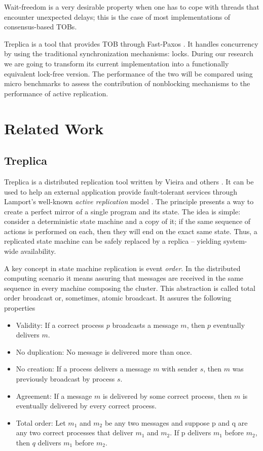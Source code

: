 \documentclass[12pt]{article}
\begin{document}
Wait-freedom is a very  desirable property when one has to cope with threads
that encounter unexpected delays; this  is the case
of  most  implementations of  consensus-based  TOBs.

Treplica \cite{vieira2008} is a tool that provides TOB through Fast-Paxos
\cite{Lamport2006}. It handles concurrency by using the traditional
synchronization mechanisms: locks. During our research we are going to transform
its current implementation  into a functionally equivalent lock-free version.
The  performance of the two will be compared using micro benchmarks to assess
the contribution  of nonblocking mechanisms to the  performance of active
replication.


\section{Related Work}
\label{sec:related}
\subsection{Treplica}
Treplica is a distributed replication tool written by Vieira and others
\cite{vieira2008}. It can be used to help an external application provide
fault-tolerant services through Lamport's well-known \textit{active replication}
model \cite{Lamport1978}. The principle presents a way to create a perfect
mirror of a single program and its state. The idea is simple: consider a
deterministic state machine and a copy of it; if the same sequence of actions is
performed on each, then they will end on the exact same state. Thus, a
replicated state machine can be safely replaced by a replica -- yielding
system-wide availability.

A key concept in state machine replication is event \textit{order}. In the
distributed computing scenario it means assuring that messages are received in
the same sequence in every machine composing the cluster. This abstraction is
called total order broadcast or, sometimes, atomic broadcast. It assures the
following properties \cite{cachin2011}

\begin{itemize}
\item Validity: If a correct process $p$ broadcasts a message $m$, then $p$
eventually delivers $m$.
\item No duplication: No message is delivered more than once.
\item No creation: If a process delivers a message $m$ with sender $s$, then $m$
was previously broadcast by process $s$.
\item Agreement: If a message $m$ is delivered by some correct process, then $m$
is eventually delivered by every correct process.
\item Total order: Let $m_1$ and $m_2$ be any two messages and suppose p and q
are any two correct processes that deliver $m_1$ and $m_2$. If p delivers $m_1$
before $m_2$, then $q$ delivers $m_1$ before $m_2$.
\end{itemize}
\end{document}
